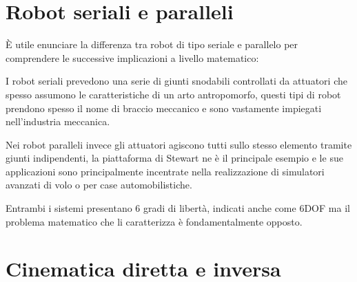 \documentclass[11pt]{article}
\begin{document}
\section{Robot seriali e paralleli}\label{robotserialiparalleli}
È utile enunciare la differenza tra robot di tipo seriale e parallelo per comprendere le successive implicazioni a livello matematico:

I robot seriali prevedono una serie di giunti snodabili controllati da attuatori che spesso assumono le caratteristiche di un arto antropomorfo, questi tipi di robot prendono spesso il nome di braccio meccanico e sono vastamente impiegati nell'industria meccanica.

Nei robot paralleli invece gli attuatori agiscono tutti sullo stesso elemento tramite giunti indipendenti, la piattaforma di Stewart ne è il principale esempio e le sue applicazioni sono principalmente incentrate nella realizzazione di simulatori avanzati di volo o per case automobilistiche.

Entrambi i sistemi presentano 6 gradi di libertà, indicati anche come 6DOF ma il problema matematico che li caratterizza è fondamentalmente opposto.


\section{Cinematica diretta e inversa}\label{cinematicadirettainversa}
\end{document}
